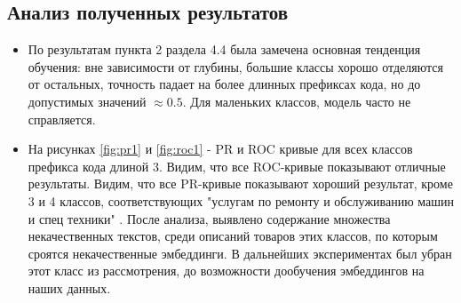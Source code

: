 \documentclass{article}
\begin{document}
\subsection{Анализ полученных результатов}
\begin{itemize}
    \item По результатам пункта 2 раздела 4.4 была замечена основная тенденция обучения: вне зависимости от глубины, большие классы хорошо отделяются от остальных, точность падает на более длинных префиксах кода, но до допустимых значений $\approx0.5$. Для маленьких классов, модель часто не справляется.
    \item На рисунках \ref{fig:pr1} и \ref{fig:roc1} - PR и ROC кривые для всех классов префикса кода длиной 3. Видим, что все ROC-кривые показывают отличные результаты. Видим, что все PR-кривые показывают хороший результат, кроме 3 и 4 классов, соответствующих "услугам по ремонту и обслуживанию машин и спец техники" . После анализа, выявлено содержание множества некачественных текстов, среди описаний товаров этих классов, по которым сроятся некачественные эмбеддинги. В дальнейших экспериментах был убран этот класс из рассмотрения, до возможности дообучения эмбеддингов на наших данных.
    
\end{itemize}
\end{document}

